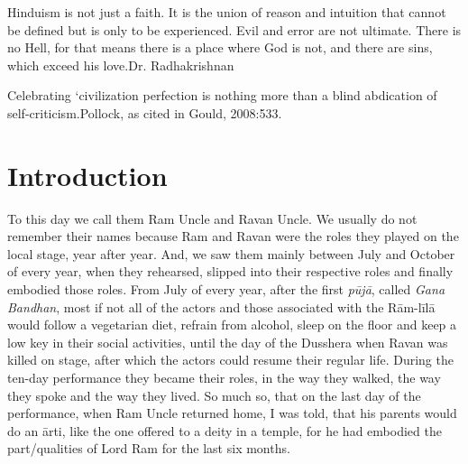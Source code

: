 \begin{myquote}
Hinduism is not just a faith. It is the union of reason and intuition that cannot be defined but is only to be experienced. Evil and error are not ultimate. There is no Hell, for that means there is a place where God is not, and there are sins, which exceed his love.\hfill Dr. Radhakrishnan
\end{myquote}

\begin{myquote}
Celebrating ‘civilization perfection is nothing more than a blind abdication of self-criticism.\hfill Pollock, as cited in Gould, 2008:533.
\end{myquote}


\section*{Introduction}

To this day we call them Ram Uncle and Ravan Uncle. We usually do not remember their names because Ram and Ravan were the roles they played on the local stage, year after year. And, we saw them mainly between July and October of every year, when they rehearsed, slipped into their respective roles and finally embodied those roles. From July of every year, after the first \textit{pūjā}, called \textit{Gana Bandhan}, most if not all of the actors and those associated with the Rām-līlā would follow a vegetarian diet, refrain from alcohol, sleep on the floor and keep a low key in their social activities, until the day of the Dusshera when Ravan was killed on stage, after which the actors could resume their regular life. During the ten-day performance they became their roles, in the way they walked, the way they spoke and the way they lived. So much so, that on the last day of the performance, when Ram Uncle returned home, I was told, that his parents would do an ārti, like the one offered to a deity in a temple, for he had embodied the part/qualities of Lord Ram for the last six months.


